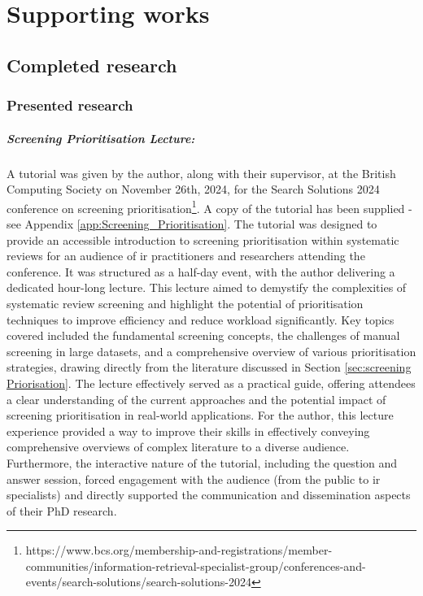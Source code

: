 \documentclass[10pt,oneside]{book}
\begin{document}
\chapter{Supporting works}
\section{Completed research}

\subsection{Presented research}

\paragraph{Screening Prioritisation Lecture:}
A tutorial was given by the author, along with their supervisor, at the British Computing Society on November 26th, 2024, for the Search Solutions 2024 conference on screening prioritisation\footnote{https://www.bcs.org/membership-and-registrations/member-communities/information-retrieval-specialist-group/conferences-and-events/search-solutions/search-solutions-2024}. A copy of the tutorial has been supplied - see Appendix \ref{app:Screening_Prioritisation}. The tutorial was designed to provide an accessible introduction to screening prioritisation within systematic reviews for an audience of \gls*{ir} practitioners and researchers attending the conference. It was structured as a half-day event, with the author delivering a dedicated hour-long lecture. This lecture aimed to demystify the complexities of systematic review screening and highlight the potential of prioritisation techniques to improve efficiency and reduce workload significantly. Key topics covered included the fundamental screening concepts, the challenges of manual screening in large datasets, and a comprehensive overview of various prioritisation strategies, drawing directly from the literature discussed in Section \ref{sec:screening Priorisation}. The lecture effectively served as a practical guide, offering attendees a clear understanding of the current approaches and the potential impact of screening prioritisation in real-world applications. For the author, this lecture experience provided a way to improve their skills in effectively conveying comprehensive overviews of complex literature to a diverse audience. Furthermore, the interactive nature of the tutorial, including the question and answer session, forced engagement with the audience (from the public to \gls*{ir} specialists) and directly supported the communication and dissemination aspects of their PhD research.
\end{document}
